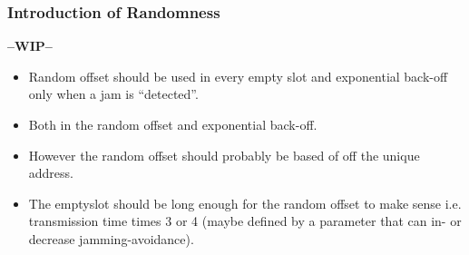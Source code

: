 \subsubsection{Introduction of Randomness} %
\label{ssub:introduction_of_randomness}
\textbf{--WIP--}
\begin{itemize}
    \item Random offset should be used in every empty slot and exponential back-off only when a jam is ``detected''.
    \item Both in the random offset and exponential back-off.
    \item However the random offset should probably be based of off the unique address.
    \item The emptyslot should be long enough for the random offset to make sense i.e. transmission time times 3 or 4 (maybe defined by a parameter that can in- or decrease jamming-avoidance).
\end{itemize}  


